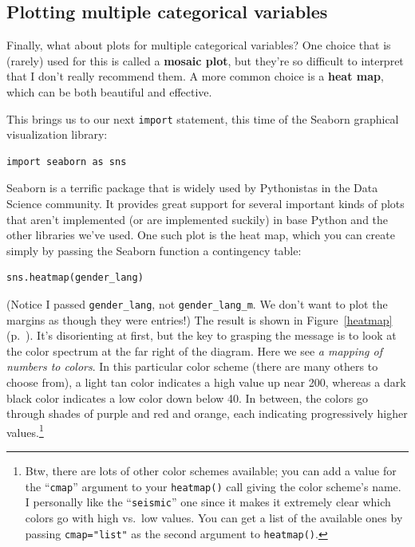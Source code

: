 \label{marginsEnd}

\subsection{Plotting multiple categorical variables}


Finally, what about plots for multiple categorical variables? One choice that
is (rarely) used for this is called a \textbf{mosaic plot}, but they're so
difficult to interpret that I don't really recommend them. A more common choice
is a \textbf{heat map}, which can be both beautiful and effective.


This brings us to our next \texttt{import} statement, this time of the Seaborn
graphical visualization library:

\begin{Verbatim}[fontsize=\small,samepage=true,frame=single,framesep=3mm]
import seaborn as sns
\end{Verbatim}

Seaborn is a terrific package that is widely used by Pythonistas in the Data
Science community. It provides great support for several important kinds of
plots that aren't implemented (or are implemented suckily) in base Python and
the other libraries we've used. One such plot is the heat map, which you can
create simply by passing the Seaborn function a contingency table:


\begin{Verbatim}[fontsize=\small,samepage=true,frame=single,framesep=3mm]
sns.heatmap(gender_lang)
\end{Verbatim}

(Notice I passed \texttt{gender\_lang}, not \texttt{gender\_lang\_m}. We don't
want to plot the margins as though they were entries!) The result is shown in
Figure~\ref{heatmap} (p.~\pageref{heatmap}). It's disorienting at first, but
the key to grasping the message is to look at the color spectrum at the far
right of the diagram. Here we see \textit{a mapping of numbers to colors}. In
this particular color scheme (there are many others to choose from), a light
tan color indicates a high value up near 200, whereas a dark black color
indicates a low color down below 40. In between, the colors go through shades
of purple and red and orange, each indicating progressively higher
values.\footnote{Btw, there are lots of other color schemes available; you can
add a value for the ``\texttt{cmap}'' argument to your \texttt{heatmap()} call
giving the color scheme's name. I personally like the
``\texttt{seismic}'' one since
it makes it extremely clear which colors go with high vs.~low values. You can
get a list of the available ones by passing \texttt{cmap="list"} as the second
argument to \texttt{heatmap()}.}


